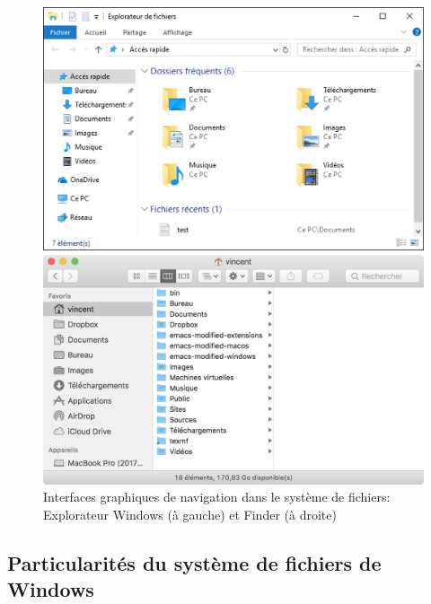 \begin{figure}
  \begin{minipage}{0.48\linewidth}
    \includegraphics[width=\linewidth]{explorer}
  \end{minipage}
  \hfill
  \begin{minipage}{0.48\linewidth}
    \includegraphics[width=\linewidth]{finder}
  \end{minipage}
  \caption[Interfaces graphiques de navigation dans le système de
  fichiers]{Interfaces graphiques de navigation dans le système de
    fichiers: Explorateur Windows (à gauche) et Finder (à droite)}
  \label{fig:informatique:explorer+finder}
\end{figure}


\subsection{Particularités du système de fichiers de Windows}
\label{sec:informatique:fs:windows}


